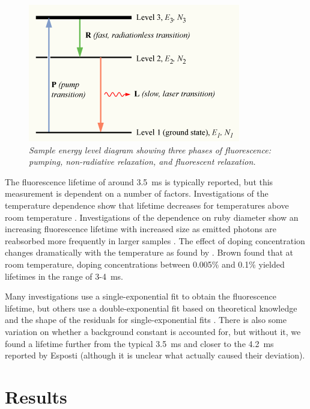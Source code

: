 \documentclass[11pt, a4paper, twocolumn]{article}
\begin{document}
\begin{figure}
\includegraphics[width=\linewidth]{Population-inversion-3level.png}
\caption{\textit{Sample energy level diagram showing three phases of fluorescence: pumping, non-radiative relaxation, and fluorescent relaxation.}}
\label{fig:populationInversion}
\end{figure}

The fluorescence lifetime of around \SI{3.5}{\ms} is typically reported, but this measurement is dependent on a number of factors. Investigations of the temperature dependence show that lifetime decreases for temperatures above room temperature \cite{Seat, Nelson}. Investigations of the dependence on ruby diameter show an increasing fluorescence lifetime with increased size as emitted photons are reabsorbed more frequently in larger samples \cite{Jones}. The effect of doping concentration changes dramatically with the temperature as found by \cite{Brown}. Brown found that at room temperature, doping concentrations between 0.005\% and 0.1\% yielded lifetimes in the range of 3-\SI{4}{\ms}.

Many investigations use a single-exponential fit to obtain the fluorescence lifetime, but others use a double-exponential fit based on theoretical knowledge and the shape of the residuals for single-exponential fits \cite{McBane, Jones}. There is also some variation on whether a background constant is accounted for, but without it, we found a lifetime further from the typical \SI{3.5}{\ms} and closer to the \SI{4.2}{\ms} reported by Esposti (although it is unclear what actually caused their deviation).

\section*{Results}
\end{document}

